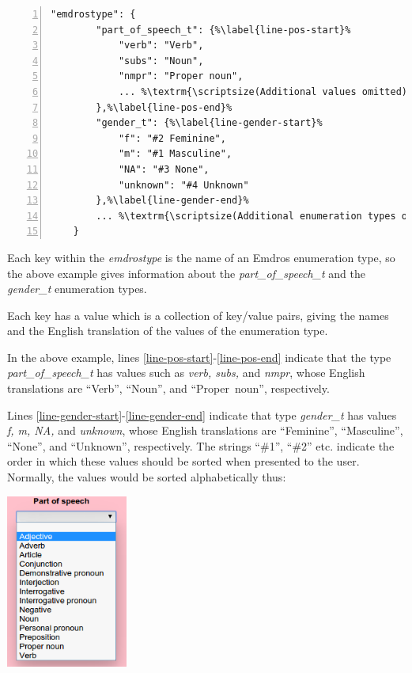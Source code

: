 \documentclass[11pt,oneside,a4paper]{memoir}
\begin{document}
\begin{lstlisting}[numbers=left,caption=A sample emdrostype value,label=list-emdrostype-sample]
    "emdrostype": {
        "part_of_speech_t": {%\label{line-pos-start}%
            "verb": "Verb",
            "subs": "Noun",
            "nmpr": "Proper noun",
            ... %\textrm{\scriptsize(Additional values omitted)}%
        },%\label{line-pos-end}%
        "gender_t": {%\label{line-gender-start}%
            "f": "#2 Feminine",
            "m": "#1 Masculine",
            "NA": "#3 None",
            "unknown": "#4 Unknown"
        },%\label{line-gender-end}%
        ... %\textrm{\scriptsize(Additional enumeration types omitted)}%
    }
\end{lstlisting}

Each key within the \emph{emdrostype} is the name of an Emdros enumeration type, so the above
example gives information about the \emph{part\_of\_speech\_t} and the \emph{gender\_t} enumeration
types.

Each key has a value which is a collection of key/value pairs, giving the names and the English
translation of the values of the enumeration type.

In the above example, lines \ref{line-pos-start}-\ref{line-pos-end} indicate that the type
\emph{part\_of\_speech\_t} has values such as \emph{verb, subs,} and \emph{nmpr}, whose English
translations are ``Verb'', ``Noun'', and ``Proper~noun'', respectively.

Lines \ref{line-gender-start}-\ref{line-gender-end} indicate that type \emph{gender\_t} has values
\emph{f, m, NA,} and \emph{unknown}, whose English translations are ``Feminine'', ``Masculine'',
``None'', and ``Unknown'', respectively. The strings ``\#1'', ``\#2'' etc. indicate the order in
which these values should be sorted when presented to the user. Normally, the values would be sorted
alphabetically thus:

\begin{center}
  \includegraphics[width=0.3\textwidth]{psp.png}
\end{center}
\end{document}

